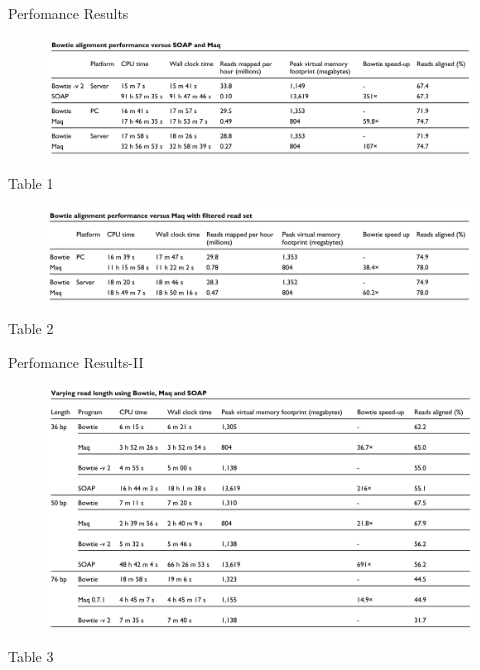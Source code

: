 \documentclass[mathserif]{beamer}
\begin{document}
\begin{frame}{Perfomance Results}
\begin{center}        
    \begin{figure}
        \includegraphics[width=\textwidth]{media/tab1.png}
    \end{figure} \tiny Table 1
    \pause
    \begin{figure}
        \includegraphics[width=\textwidth]{media/tab2.png}
    \end{figure}\tiny Table 2
\end{center}
\end{frame}

\begin{frame}{Perfomance Results-II}
    \begin{figure}
        \includegraphics[width=\textwidth]{media/tab3.png}
    \end{figure}\centering \tiny Table 3
\end{frame}
\end{document}
